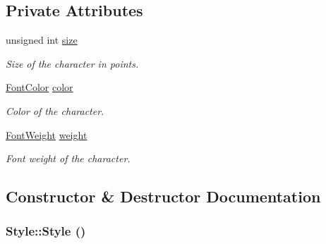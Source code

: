 \subsection*{Private Attributes}
\begin{CompactItemize}
\item 
\hypertarget{class_style_ede56099c2297cd24b6fe9904f857447}{
unsigned int \hyperlink{class_style_ede56099c2297cd24b6fe9904f857447}{size}}
\label{class_style_ede56099c2297cd24b6fe9904f857447}

\begin{CompactList}\small\item\em Size of the character in points. \item\end{CompactList}\item 
\hypertarget{class_style_ff542273b06e2a626793ae7090caff8e}{
\hyperlink{struct_font_color}{FontColor} \hyperlink{class_style_ff542273b06e2a626793ae7090caff8e}{color}}
\label{class_style_ff542273b06e2a626793ae7090caff8e}

\begin{CompactList}\small\item\em Color of the character. \item\end{CompactList}\item 
\hypertarget{class_style_929c96268fed4e85fb2fca9fa619c4b9}{
\hyperlink{_font_weight_8h_ecff23ba4a68486421bcea57e095fe66}{FontWeight} \hyperlink{class_style_929c96268fed4e85fb2fca9fa619c4b9}{weight}}
\label{class_style_929c96268fed4e85fb2fca9fa619c4b9}

\begin{CompactList}\small\item\em Font weight of the character. \item\end{CompactList}\end{CompactItemize}


\subsection{Constructor \& Destructor Documentation}
\hypertarget{class_style_914f187818eb30c0cebe3df5378bfa0a}{
\subsubsection[Style]{\setlength{\rightskip}{0pt plus 5cm}Style::Style ()}}
\label{class_style_914f187818eb30c0cebe3df5378bfa0a}


